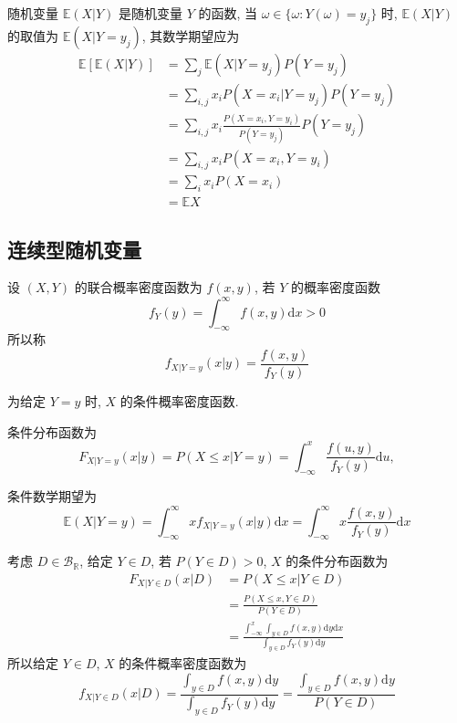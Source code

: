 \documentclass[openany]{ctexbook}
\theoremstyle{kaiti}
\theoremstyle{normal}
\begin{document}
随机变量 $\mathbb{E}(X|Y)$ 是随机变量 $Y$ 的函数, 当 $\omega\in\{\omega:Y(\omega)=y_j\}$ 时, $\mathbb{E}(X|Y)$ 的取值为 $\mathbb{E}(X|Y=y_j)$, 其数学期望应为 
\begin{equation}
  \begin{aligned}
  \mathbb{E}[\mathbb{E}(X|Y)]
  &=\sum_j\mathbb{E}(X|Y=y_j)P(Y=y_j)\\
  &=\sum_{i,j}x_iP(X=x_i|Y=y_j)P(Y=y_j)\\
  &=\sum_{i,j}x_i\frac{P(X=x_i,Y=y_i)}{P(Y=y_j)}P(Y=y_j)\\
  &=\sum_{i,j}x_iP(X=x_i,Y=y_i)\\
  &=\sum_{i}x_iP(X=x_i)\\
  &=\mathbb{E}X
  \end{aligned}
\end{equation}

\subsection{连续型随机变量}

设 $(X,Y)$ 的联合概率密度函数为 $f(x,y)$, 若 $Y$ 的概率密度函数 
\begin{equation}
  f_Y(y)=\int_{-\infty}^\infty f(x,y)\mathrm{d}x>0
\end{equation} 
所以称
\begin{equation}
  f_{X|Y=y}(x|y)=\frac{f(x,y)}{f_Y(y)}
\end{equation}

为给定 $Y=y$ 时, $X$ 的条件概率密度函数.

条件分布函数为
\begin{equation}
  F_{X|Y=y}(x|y)=P(X\leqslant x|Y=y)=\int_{-\infty}^x\frac{f(u,y)}{f_Y(y)}\mathrm{d}u,
\end{equation}

条件数学期望为
\begin{equation}
  \mathbb{E}(X|Y=y)=\int_{-\infty}^\infty xf_{X|Y=y}(x|y)\mathrm{d}x=\int_{-\infty}^\infty x\frac{f(x,y)}{f_Y(y)}\mathrm{d}x
\end{equation}

考虑 $D\in\mathcal{B}_{\mathbb{R}}$, 给定 $Y\in D$, 若 $P(Y\in D)>0$, $X$ 的条件分布函数为
\begin{equation}
  \begin{aligned}
    F_{X|Y\in D}(x|D)
    &=P(X\leqslant x|Y\in D)\\
    &=\frac{P(X\leqslant x,Y\in D)}{P(Y\in D)}\\
    &=\frac{\displaystyle\int_{-\infty}^x\int_{y\in D}f(x,y)\mathrm{d}y\mathrm{d}x}{\displaystyle\int_{y\in D}f_Y(y)\mathrm{d}y}
  \end{aligned}
\end{equation}
所以给定 $Y\in D$, $X$ 的条件概率密度函数为
\begin{equation}
  f_{X|Y\in D}(x|D)=\frac{\displaystyle\int_{y\in D}f(x,y)\mathrm{d}y}{\displaystyle\int_{y\in D}f_Y(y)\mathrm{d}y}=\frac{\displaystyle\int_{y\in D}f(x,y)\mathrm{d}y}{P(Y\in D)}
\end{equation}
\end{document}
